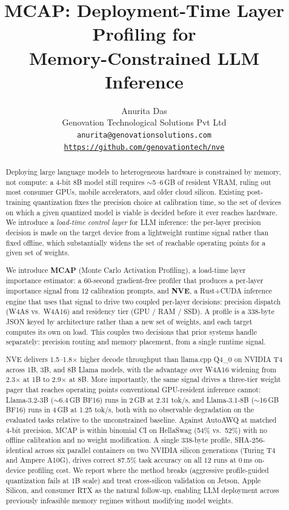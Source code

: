 \documentclass{article}
\title{MCAP: Deployment-Time Layer Profiling for \\
Memory-Constrained LLM Inference}
\author{%
  Anurita Das \\
  Genovation Technological Solutions Pvt Ltd \\
  \texttt{anurita@genovationsolutions.com} \\
  \texttt{\url{https://github.com/genovationtech/nve}} \\
}
\begin{document}
\maketitle

\begin{abstract}
Deploying large language models to heterogeneous hardware is constrained by
memory, not compute: a 4-bit 8B model still requires $\sim$5--6\,GB of
resident VRAM, ruling out most consumer GPUs, mobile accelerators, and
older cloud silicon. Existing post-training quantization fixes the
precision choice at calibration time, so the set of devices on which a
given quantized model is viable is decided before it ever reaches
hardware. We introduce a \emph{load-time control layer} for LLM inference: the
per-layer precision decision is made on the target device from a
lightweight runtime signal rather than fixed offline, which substantially
widens the set of reachable operating points for a given set of weights.

We introduce \textbf{MCAP} (Monte Carlo Activation Profiling), a
load-time layer importance estimator: a 60-second gradient-free
profiler that produces a per-layer importance signal from 12
calibration prompts, and \textbf{NVE}, a Rust+CUDA
inference engine that uses that signal to drive two coupled per-layer
decisions: precision dispatch (W4A8 vs.\ W4A16) and residency tier
(GPU / RAM / SSD). A profile is a 338-byte JSON keyed by architecture
rather than a new set of weights, and each target computes its own on
load. This couples two decisions that prior systems handle separately:
precision routing and memory placement, from a single runtime signal.

NVE delivers 1.5--1.8$\times$ higher decode throughput than llama.cpp
Q4\_0 on NVIDIA T4 across 1B, 3B, and 8B Llama models, with the
advantage over W4A16 widening from 2.3$\times$ at 1B to 2.9$\times$ at
8B. More importantly, the same signal drives a three-tier weight pager
that reaches operating points conventional GPU-resident inference
cannot: Llama-3.2-3B ($\sim$6.4\,GB BF16) runs in 2\,GB at 2.31 tok/s,
and Llama-3.1-8B ($\sim$16\,GB BF16) runs in 4\,GB at 1.25 tok/s, both
with no observable degradation on the evaluated tasks relative to the
unconstrained baseline. Against AutoAWQ at matched
4-bit precision, MCAP is within binomial CI on HellaSwag (54\% vs.\
52\%) with no offline calibration and no weight modification. A single
338-byte profile, SHA-256-identical across six parallel containers on
two NVIDIA silicon generations (Turing T4 and Ampere A10G), drives
correct 87.5\% task accuracy on all 12 runs at 0\,ms on-device
profiling cost. We report where the method breaks (aggressive
profile-guided quantization fails at 1B scale) and treat cross-silicon
validation on Jetson, Apple Silicon, and consumer RTX as the natural
follow-up, enabling LLM deployment across previously infeasible memory
regimes without modifying model weights.
\end{abstract}
\end{document}
